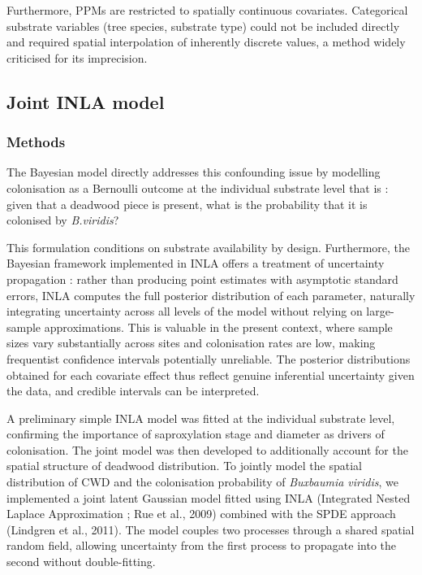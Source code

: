 \documentclass[
  letterpaper,
  DIV=11,
  numbers=noendperiod]{scrartcl}
\begin{document}
Furthermore, PPMs are restricted to spatially continuous covariates.
Categorical substrate variables (tree species, substrate type) could not
be included directly and required spatial interpolation of inherently
discrete values, a method widely criticised for its imprecision.

\subsection{Joint INLA model}\label{joint-inla-model}

\subsubsection{Methods}\label{methods}

The Bayesian model directly addresses this confounding issue by
modelling colonisation as a Bernoulli outcome at the individual
substrate level that is : given that a deadwood piece is present, what
is the probability that it is colonised by \emph{B.viridis}?

This formulation conditions on substrate availability by design.
Furthermore, the Bayesian framework implemented in INLA offers a
treatment of uncertainty propagation : rather than producing point
estimates with asymptotic standard errors, INLA computes the full
posterior distribution of each parameter, naturally integrating
uncertainty across all levels of the model without relying on
large-sample approximations. This is valuable in the present context,
where sample sizes vary substantially across sites and colonisation
rates are low, making frequentist confidence intervals potentially
unreliable. The posterior distributions obtained for each covariate
effect thus reflect genuine inferential uncertainty given the data, and
credible intervals can be interpreted.

A preliminary simple INLA model was fitted at the individual substrate
level, confirming the importance of saproxylation stage and diameter as
drivers of colonisation. The joint model was then developed to
additionally account for the spatial structure of deadwood distribution.
To jointly model the spatial distribution of CWD and the colonisation
probability of \emph{Buxbaumia viridis}, we implemented a joint latent
Gaussian model fitted using INLA (Integrated Nested Laplace
Approximation ; Rue et al., 2009) combined with the SPDE approach
(Lindgren et al., 2011). The model couples two processes through a
shared spatial random field, allowing uncertainty from the first process
to propagate into the second without double-fitting.
\end{document}
